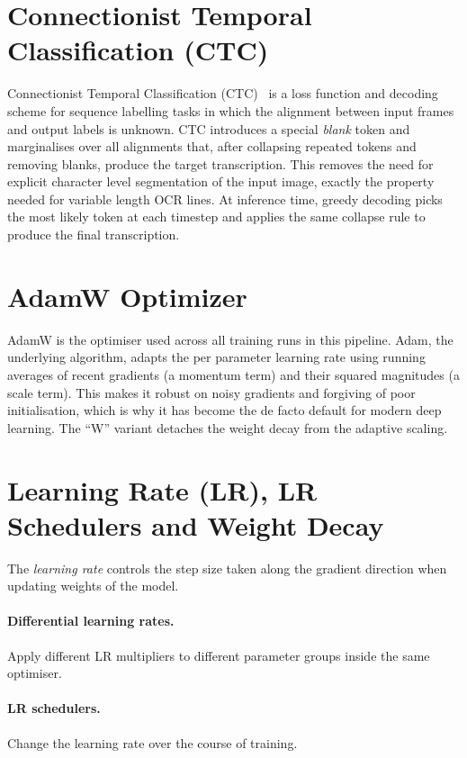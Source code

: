 \section{Connectionist Temporal Classification (CTC)}
\label{sec:appendix-ctc}

Connectionist Temporal Classification (CTC)~\cite{graves2006ctc} is a loss function and decoding scheme for sequence labelling tasks in which the alignment between input frames and output labels is unknown. CTC introduces a special \textit{blank} token and marginalises over all alignments that, after collapsing repeated tokens and removing blanks, produce the target transcription. This removes the need for explicit character level segmentation of the input image, exactly the property needed for variable length OCR lines. At inference time, greedy decoding picks the most likely token at each timestep and applies the same collapse rule to produce the final transcription.

\section{AdamW Optimizer}
\label{sec:appendix-adamw}

AdamW is the optimiser used across all training runs in this pipeline. Adam, the underlying algorithm, adapts the per parameter learning rate using running averages of recent gradients (a momentum term) and their squared magnitudes (a scale term). This makes it robust on noisy gradients and forgiving of poor initialisation, which is why it has become the de facto default for modern deep learning. The ``W'' variant detaches the weight decay from the adaptive scaling.

\section{Learning Rate (LR), LR Schedulers and Weight Decay}
\label{sec:appendix-lr}

The \textit{learning rate} controls the step size taken along the gradient direction when updating weights of the model.

\paragraph{Differential learning rates.} Apply different LR multipliers to different parameter groups inside the same optimiser.

\paragraph{LR schedulers.} Change the learning rate over the course of training.

